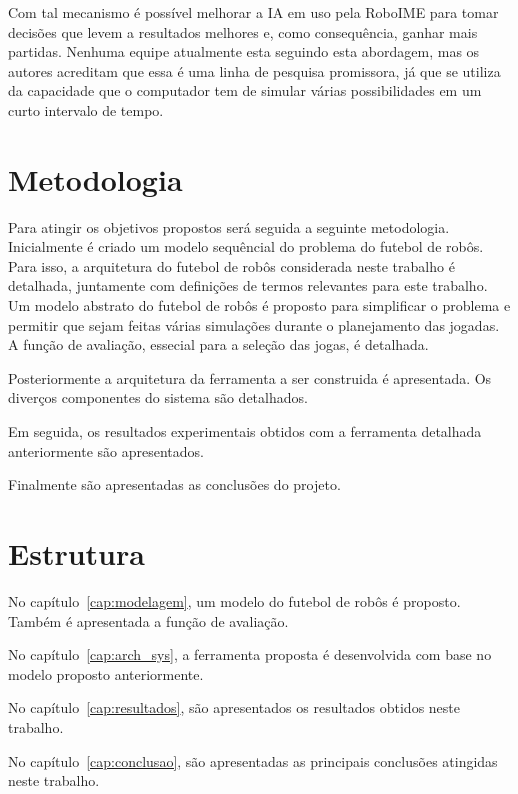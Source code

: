 Com tal mecanismo é possível melhorar a IA em uso pela RoboIME para tomar
decisões que levem a resultados melhores e, como consequência, ganhar mais
partidas. Nenhuma equipe atualmente esta seguindo esta abordagem, mas os autores
acreditam que essa é uma linha de pesquisa promissora, já que se utiliza da
capacidade que o computador tem de simular várias possibilidades em um curto
intervalo de tempo.

\section{Metodologia}

Para atingir os objetivos propostos será seguida a seguinte metodologia.
Inicialmente é criado um modelo sequêncial do problema do futebol de robôs. 
Para isso, a arquitetura do futebol de robôs considerada neste trabalho é
detalhada, juntamente com definições de termos relevantes para este trabalho.
Um modelo abstrato do futebol de robôs é proposto para simplificar o problema
e permitir que sejam feitas várias simulações durante o planejamento das
jogadas. A função de avaliação, essecial para a seleção das jogas, é detalhada.

Posteriormente a arquitetura da ferramenta a ser construida é apresentada.
Os diverços componentes do sistema são detalhados.

Em seguida, os resultados experimentais obtidos com a ferramenta detalhada
anteriormente são apresentados.

Finalmente são apresentadas as conclusões do projeto.

\section{Estrutura}

No capítulo~\ref{cap:modelagem}, um modelo do futebol de robôs é proposto.
Também é apresentada a função de avaliação.

No capítulo~\ref{cap:arch_sys}, a ferramenta proposta é desenvolvida com
base no modelo proposto anteriormente.

No capítulo~\ref{cap:resultados}, são apresentados os resultados obtidos
neste trabalho.

No capítulo~\ref{cap:conclusao}, são apresentadas as principais conclusões
atingidas neste trabalho.

